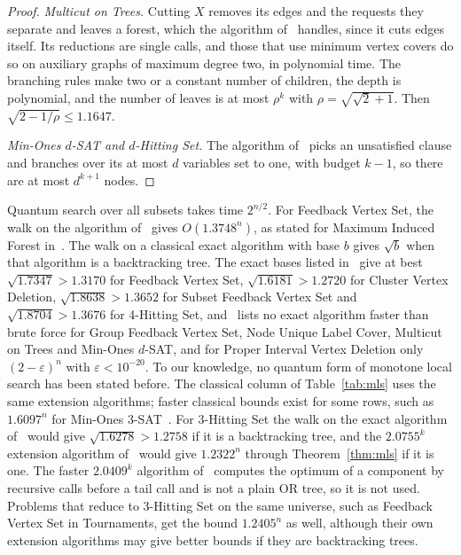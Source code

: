 \documentclass[11pt]{article}
\theoremstyle{remark}
\begin{document}
\begin{proof}
\emph{Multicut on Trees.} Cutting $X$ removes its edges and the requests they separate and leaves a forest, which the algorithm of~\cite{KLL13} handles, since it cuts edges itself. Its reductions are single calls, and those that use minimum vertex covers do so on auxiliary graphs of maximum degree two, in polynomial time. The branching rules make two or a constant number of children, the depth is polynomial, and the number of leaves is at most $\rho^k$ with $\rho = \sqrt{\sqrt2+1}$. Then $\sqrt{2-1/\rho} \le 1.1647$.

\emph{Min-Ones $d$-SAT and $d$-Hitting Set.} The algorithm of~\cite{FGLS19} picks an unsatisfied clause and branches over its at most $d$ variables set to one, with budget $k-1$, so there are at most $d^{k+1}$ nodes.
\end{proof}

Quantum search over all subsets takes time $2^{n/2}$. For Feedback Vertex Set, the walk on the algorithm of~\cite{Raz06} gives $O(1.3748^n)$, as stated for Maximum Induced Forest in~\cite{LU-MIF}. The walk on a classical exact algorithm with base $b$ gives $\sqrt{b}$ when that algorithm is a backtracking tree. The exact bases listed in~\cite{FGLS19} give at best $\sqrt{1.7347} > 1.3170$ for Feedback Vertex Set, $\sqrt{1.6181} > 1.2720$ for Cluster Vertex Deletion, $\sqrt{1.8638} > 1.3652$ for Subset Feedback Vertex Set and $\sqrt{1.8704} > 1.3676$ for 4-Hitting Set, and~\cite{FGLS19} lists no exact algorithm faster than brute force for Group Feedback Vertex Set, Node Unique Label Cover, Multicut on Trees and Min-Ones $d$-SAT, and for Proper Interval Vertex Deletion only $(2-\varepsilon)^n$ with $\varepsilon < 10^{-20}$. To our knowledge, no quantum form of monotone local search has been stated before. The classical column of Table~\ref{tab:mls} uses the same extension algorithms; faster classical bounds exist for some rows, such as $1.6097^n$ for Min-Ones 3-SAT~\cite{FGLS19}. For 3-Hitting Set the walk on the exact algorithm of~\cite{Wah07} would give $\sqrt{1.6278} > 1.2758$ if it is a backtracking tree, and the $2.0755^k$ extension algorithm of~\cite{Wah07} would give $1.2322^n$ through Theorem~\ref{thm:mls} if it is one. The faster $2.0409^k$ algorithm of~\cite{Tsu25} computes the optimum of a component by recursive calls before a tail call and is not a plain OR tree, so it is not used. Problems that reduce to 3-Hitting Set on the same universe, such as Feedback Vertex Set in Tournaments, get the bound $1.2405^n$ as well, although their own extension algorithms may give better bounds if they are backtracking trees.
\end{document}
